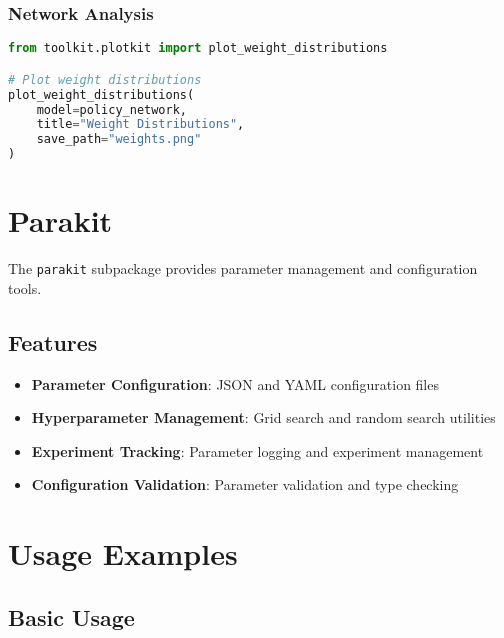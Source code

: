 \subsubsection{Network Analysis}

\begin{lstlisting}[language=python, caption=Network analysis example]
from toolkit.plotkit import plot_weight_distributions

# Plot weight distributions
plot_weight_distributions(
    model=policy_network,
    title="Weight Distributions",
    save_path="weights.png"
)
\end{lstlisting}

\section{Parakit}

The \texttt{parakit} subpackage provides parameter management and configuration tools.

\subsection{Features}

\begin{itemize}
    \item \textbf{Parameter Configuration}: JSON and YAML configuration files
    \item \textbf{Hyperparameter Management}: Grid search and random search utilities
    \item \textbf{Experiment Tracking}: Parameter logging and experiment management
    \item \textbf{Configuration Validation}: Parameter validation and type checking
\end{itemize}

\section{Usage Examples}

\subsection{Basic Usage}

